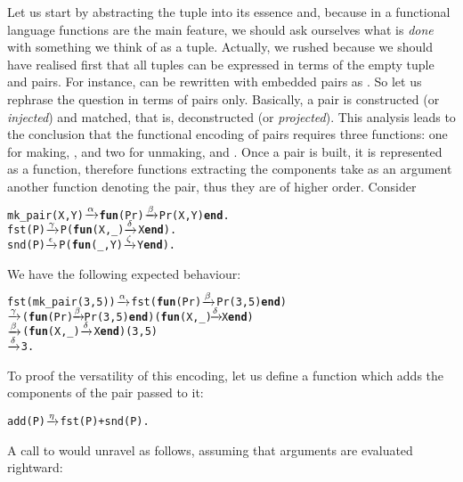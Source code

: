 Let us start by abstracting the tuple into its essence and, because in
a functional language functions are the main feature, we should ask
ourselves what is \emph{done} with something we think of as a
tuple. Actually, we rushed because we should have realised first that
all tuples can be expressed in terms of the empty tuple and pairs. For
instance, 
can be rewritten with embedded pairs as
. So let us rephrase the question in terms
of pairs only. Basically, a pair is constructed (or \emph{injected})
and matched, that is, deconstructed (or \emph{projected}). This
analysis leads to the conclusion that the functional encoding of pairs
requires three functions: one for making, , and
two for unmaking,  and . Once a pair is
built, it is represented as a function, therefore functions extracting
the components take as an argument another function denoting the pair,
thus they are of higher order. Consider
\begin{alltt}
mk\_pair(X,Y) \(\smashedrightarrow{\alpha}\) \textbf{fun}(Pr) \(\smashedrightarrow{\beta}\) Pr(X,Y) \textbf{end}.\hfill% Pr \emph{is a projection}
fst(P) \(\smashedrightarrow{\gamma}\) P(\textbf{fun}(X,\_) \(\smashedrightarrow{\delta}\) X \textbf{end}).\hfill% P \emph{denotes a pair}
snd(P) \(\smashedrightarrow{\epsilon}\) P(\textbf{fun}(\_,Y) \(\smashedrightarrow{\zeta}\) Y \textbf{end}).
\end{alltt}
We have the following expected behaviour:
\begin{alltt}
fst(mk\_pair(3,5)) \(\smashedrightarrow{\alpha}\) fst(\textbf{fun}(Pr) \(\smashedrightarrow{\beta}\) Pr(3,5) \textbf{end})
                  \(\smashedrightarrow{\gamma}\) (\textbf{fun}(Pr) \(\!\smashedrightarrow{\beta}\!\) Pr(3,5) \textbf{end})(\textbf{fun}(X,\_) \(\!\smashedrightarrow{\delta}\!\) X \textbf{end})
                  \(\smashedrightarrow{\beta}\) (\textbf{fun}(X,\_) \(\smashedrightarrow{\delta}\) X \textbf{end})(3,5)
                  \(\smashedrightarrow{\delta}\) 3.
\end{alltt}
To proof the versatility of this encoding, let us define a function
 which adds the components of the pair passed to it:
\begin{alltt}
add(P) \(\smashedrightarrow{\eta}\) fst(P) + snd(P).
\end{alltt}
A call to  would unravel as follows, assuming that
arguments are evaluated rightward:
